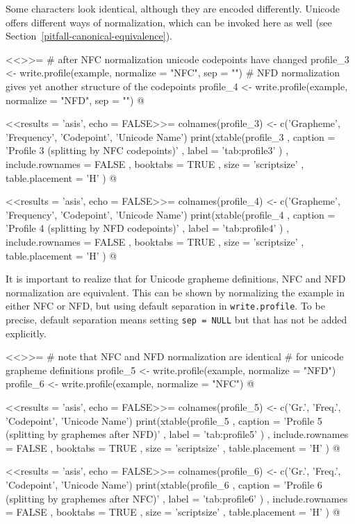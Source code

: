 \noindent Some characters look identical, although they are encoded differently. 
Unicode offers different ways of normalization, which can be invoked here as 
well (see Section~\ref{pitfall-canonical-equivalence}).

<<>>=
# after NFC normalization unicode codepoints have changed
profile_3 <- write.profile(example, normalize = "NFC", sep = "")
# NFD normalization gives yet another structure of the codepoints
profile_4 <- write.profile(example, normalize = "NFD", sep = "")
@

<<results = 'asis', echo = FALSE>>=
colnames(profile_3) <- c('Grapheme', 'Frequency', 'Codepoint', 'Unicode Name')
print(xtable(profile_3
        , caption = 'Profile 3 (splitting by NFC codepoints)'
        , label = 'tab:profile3'
        )
  , include.rownames = FALSE
  , booktabs = TRUE
  , size = 'scriptsize'
  , table.placement = 'H'
  )
@

<<results = 'asis', echo = FALSE>>=
colnames(profile_4) <- c('Grapheme', 'Frequency', 'Codepoint', 'Unicode Name')
print(xtable(profile_4
        , caption = 'Profile 4 (splitting by NFD codepoints)'
        , label = 'tab:profile4'
        )
  , include.rownames = FALSE
  , booktabs = TRUE
  , size = 'scriptsize'
  , table.placement = 'H'
  )
@

\noindent It is important to realize that for Unicode grapheme definitions, NFC 
and NFD normalization are equivalent. This can be shown by normalizing the 
example in either NFC or NFD, but using default separation in 
\texttt{write.profile}. To be precise, default separation means setting \texttt{sep = NULL} 
but that has not be added explicitly.

<<>>=
# note that NFC and NFD normalization are identical
# for unicode grapheme definitions
profile_5 <- write.profile(example, normalize = "NFD")
profile_6 <- write.profile(example, normalize = "NFC")
@

<<results = 'asis', echo = FALSE>>=
colnames(profile_5) <- c('Gr.', 'Freq.', 'Codepoint', 'Unicode Name')
print(xtable(profile_5
        , caption = 'Profile 5 (splitting by graphemes after NFD)'
        , label = 'tab:profile5'
        )
  , include.rownames = FALSE
  , booktabs = TRUE
  , size = 'scriptsize'
  , table.placement = 'H'
  )
@

<<results = 'asis', echo = FALSE>>=
colnames(profile_6) <- c('Gr.', 'Freq.', 'Codepoint', 'Unicode Name')
print(xtable(profile_6
        , caption = 'Profile 6 (splitting by graphemes after NFC)'
        , label = 'tab:profile6'
        )
  , include.rownames = FALSE
  , booktabs = TRUE
  , size = 'scriptsize'
  , table.placement = 'H'
  )
@

